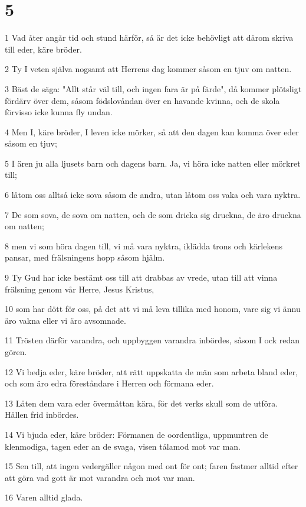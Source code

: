 \chapter{5}

\par 1 Vad åter angår tid och stund härför, så är det icke behövligt att därom skriva till eder, käre bröder.
\par 2 Ty I veten själva nogsamt att Herrens dag kommer såsom en tjuv om natten.
\par 3 Bäst de säga: "Allt står väl till, och ingen fara är på färde", då kommer plötsligt fördärv över dem, såsom födslovåndan över en havande kvinna, och de skola förvisso icke kunna fly undan.
\par 4 Men I, käre bröder, I leven icke mörker, så att den dagen kan komma över eder såsom en tjuv;
\par 5 I ären ju alla ljusets barn och dagens barn. Ja, vi höra icke natten eller mörkret till;
\par 6 låtom oss alltså icke sova såsom de andra, utan låtom oss vaka och vara nyktra.
\par 7 De som sova, de sova om natten, och de som dricka sig druckna, de äro druckna om natten;
\par 8 men vi som höra dagen till, vi må vara nyktra, iklädda trons och kärlekens pansar, med frälsningens hopp såsom hjälm.
\par 9 Ty Gud har icke bestämt oss till att drabbas av vrede, utan till att vinna frälsning genom vår Herre, Jesus Kristus,
\par 10 som har dött för oss, på det att vi må leva tillika med honom, vare sig vi ännu äro vakna eller vi äro avsomnade.
\par 11 Trösten därför varandra, och uppbyggen varandra inbördes, såsom I ock redan gören.
\par 12 Vi bedja eder, käre bröder, att rätt uppskatta de män som arbeta bland eder, och som äro edra föreståndare i Herren och förmana eder.
\par 13 Låten dem vara eder övermåttan kära, för det verks skull som de utföra. Hållen frid inbördes.
\par 14 Vi bjuda eder, käre bröder: Förmanen de oordentliga, uppmuntren de klenmodiga, tagen eder an de svaga, visen tålamod mot var man.
\par 15 Sen till, att ingen vedergäller någon med ont för ont; faren fastmer alltid efter att göra vad gott är mot varandra och mot var man.
\par 16 Varen alltid glada.
